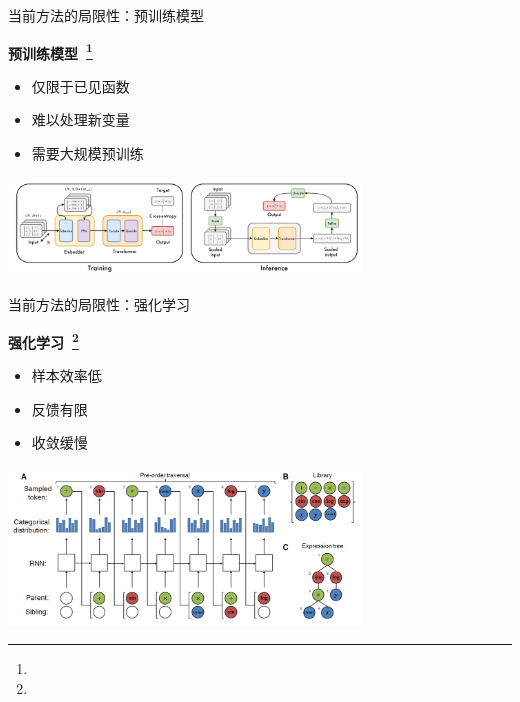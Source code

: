 \documentclass[aspectratio=1610]{beamer}
\begin{document}
    \begin{frame}{当前方法的局限性：预训练模型}

        \begin{center}
            \textbf{预训练模型~\footnote{}}
            \begin{itemize}
                \item 仅限于已见函数
                \item 难以处理新变量
                \item 需要大规模预训练
            \end{itemize}
            \includegraphics[width=0.7\textwidth]{figs/E2E.png}
        \end{center}
    \end{frame}

    \begin{frame}{当前方法的局限性：强化学习}

        \begin{center}
            \textbf{强化学习~\footnote{}}
            \begin{itemize}
                \item 样本效率低
                \item 反馈有限
                \item 收敛缓慢
            \end{itemize}
            \includegraphics[width=0.7\textwidth]{figs/DSR.png}
        \end{center}
    \end{frame}
\end{document}

